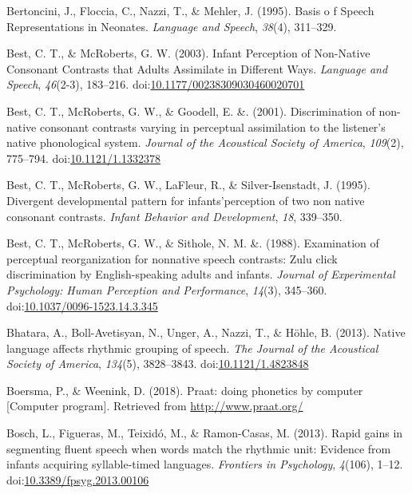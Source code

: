\documentclass[man,floatsintext]{apa6}
\begin{document}
\leavevmode\hypertarget{ref-bertoncini1995}{}%
Bertoncini, J., Floccia, C., Nazzi, T., \& Mehler, J. (1995). Basis o f Speech Representations in Neonates. \emph{Language and Speech}, \emph{38}(4), 311--329.

\leavevmode\hypertarget{ref-best2003}{}%
Best, C. T., \& McRoberts, G. W. (2003). Infant Perception of Non-Native Consonant Contrasts that Adults Assimilate in Different Ways. \emph{Language and Speech}, \emph{46}(2-3), 183--216. doi:\href{https://doi.org/10.1177/00238309030460020701}{10.1177/00238309030460020701}

\leavevmode\hypertarget{ref-best2001}{}%
Best, C. T., McRoberts, G. W., \& Goodell, E. \&. (2001). Discrimination of non-native consonant contrasts varying in perceptual assimilation to the listener's native phonological system. \emph{Journal of the Acoustical Society of America}, \emph{109}(2), 775--794. doi:\href{https://doi.org/10.1121/1.1332378}{10.1121/1.1332378}

\leavevmode\hypertarget{ref-best1995}{}%
Best, C. T., McRoberts, G. W., LaFleur, R., \& Silver-Isenstadt, J. (1995). Divergent developmental pattern for infants'perception of two non native consonant contrasts. \emph{Infant Behavior and Development}, \emph{18}, 339--350.

\leavevmode\hypertarget{ref-best1988}{}%
Best, C. T., McRoberts, G. W., \& Sithole, N. M. \&. (1988). Examination of perceptual reorganization for nonnative speech contrasts: Zulu click discrimination by English-speaking adults and infants. \emph{Journal of Experimental Psychology: Human Perception and Performance}, \emph{14}(3), 345--360. doi:\href{https://doi.org/10.1037/0096-1523.14.3.345}{10.1037/0096-1523.14.3.345}

\leavevmode\hypertarget{ref-bhatara2013}{}%
Bhatara, A., Boll-Avetisyan, N., Unger, A., Nazzi, T., \& Höhle, B. (2013). Native language affects rhythmic grouping of speech. \emph{The Journal of the Acoustical Society of America}, \emph{134}(5), 3828--3843. doi:\href{https://doi.org/10.1121/1.4823848}{10.1121/1.4823848}

\leavevmode\hypertarget{ref-praat}{}%
Boersma, P., \& Weenink, D. (2018). Praat: doing phonetics by computer {[}Computer program{]}. Retrieved from \url{http://www.praat.org/}

\leavevmode\hypertarget{ref-bosch2013}{}%
Bosch, L., Figueras, M., Teixidó, M., \& Ramon-Casas, M. (2013). Rapid gains in segmenting fluent speech when words match the rhythmic unit: Evidence from infants acquiring syllable-timed languages. \emph{Frontiers in Psychology}, \emph{4}(106), 1--12. doi:\href{https://doi.org/10.3389/fpsyg.2013.00106}{10.3389/fpsyg.2013.00106}
\end{document}
